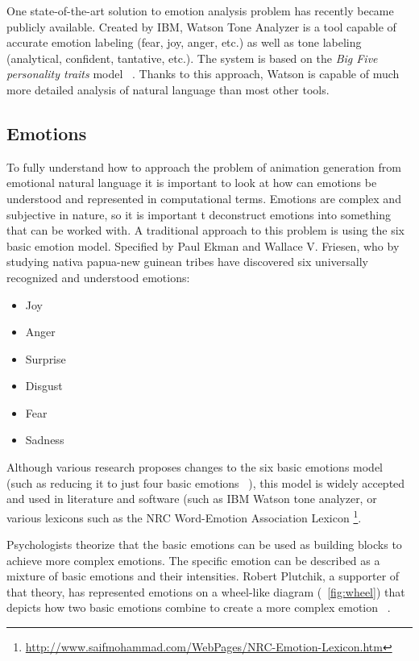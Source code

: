 One state-of-the-art solution to emotion analysis problem has recently became publicly available. Created by IBM, Watson Tone Analyzer is a tool capable of accurate emotion labeling (fear, joy, anger, etc.) as well as tone labeling (analytical, confident, tantative, etc.). The system is based on the \textit{Big Five personality traits} model ~\cite{watson}. Thanks to this approach, Watson is capable of much more detailed analysis of natural language than most other tools.


\subsection{Emotions}
To fully understand how to approach the problem of animation generation from emotional natural language it is important to look at how can emotions be understood and represented in computational terms. Emotions are complex and subjective in nature, so it is important t deconstruct emotions into something that can be worked with. A traditional approach to this problem is using the six basic emotion model. Specified by Paul Ekman and Wallace V. Friesen, who by studying nativa papua-new guinean tribes have discovered six universally recognized and understood emotions: ~\cite{basicemo}
\begin{itemize}
\item Joy
\item Anger
\item Surprise
\item Disgust
\item Fear
\item Sadness
\end{itemize}

Although various research proposes changes to the six basic emotions model (such as reducing it to just four basic emotions ~\cite{fouremo}), this model is widely accepted and used in literature and software (such as IBM Watson tone analyzer, or various lexicons such as the NRC Word-Emotion Association Lexicon \footnote{\url{http://www.saifmohammad.com/WebPages/NRC-Emotion-Lexicon.htm}}.

Psychologists theorize that the basic emotions can be used as building blocks to achieve more complex emotions. The specific emotion can be described as a mixture of basic emotions and their intensities. Robert Plutchik, a supporter of that theory, has represented emotions on a wheel-like diagram (~\ref{fig:wheel}) that depicts how two basic emotions combine to create a more complex emotion ~\cite{basicemo}.

